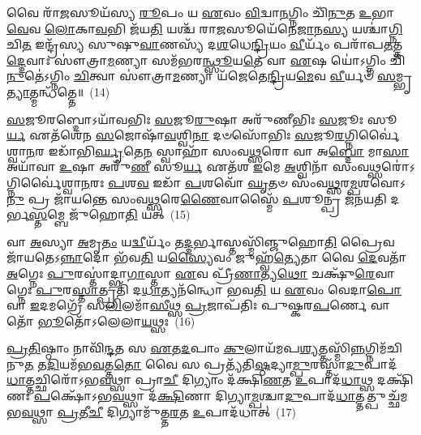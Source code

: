 𑌵𑍈 𑌰𑌾᳴\-\ul{𑌜}\-𑌸𑍂𑌯᳴𑌸𑍍𑌯 \ul{𑌰𑍂}\-𑌪𑌂 𑌯 \ul{𑌏}\-𑌵𑌂 \ul{𑌵𑌿}\-𑌦𑍍𑌵𑌾\-\ul{𑌨}\-𑌗𑍍𑌨𑌿𑌂 𑌚𑌿᳴\-\ul{𑌨𑍁}\-𑌤 \ul{𑌉}\-𑌭𑌾\-\ul{𑌵𑍇}\-𑌵 \ul{𑌲𑍋}\-𑌕𑌾\-\ul{𑌵}\-𑌭𑌿 𑌜᳴𑌯\-\ul{𑌤𑌿} 𑌯𑌶𑍍𑌚᳴ 𑌰𑌾\-\ul{𑌜}\-𑌸𑍂𑌯𑍇᳴𑌨𑍇\-\ul{𑌜𑌾}\-𑌨\-\ul{𑌸𑍍𑌯} 𑌯𑌶𑍍𑌚𑌾॑\-\ul{𑌗𑍍𑌨𑌿}\-𑌚𑌿\-\ul{𑌤} 𑌇𑌨𑍍𑌦𑍍𑌰᳴𑌸𑍍𑌯 𑌸𑍁𑌷𑍁\-\ul{𑌵𑌾}\-𑌣𑌸𑍍𑌯᳴ 𑌦\-\ul{𑌶}\-𑌧𑍇\-\ul{𑌨𑍍𑌦𑍍𑌰𑌿}\-𑌯𑌂 \ul{𑌵𑍀}\-𑌰𑍍𑌯𑌂᳴ 𑌪𑌰𑌾᳴𑌪\-\ul{𑌤}\-𑌤𑍍𑌤\-\ul{𑌦𑍍𑌦𑍇}\-𑌵𑌾𑌃 𑌸𑍗॑𑌤𑍍𑌰𑌾\-\ul{𑌮}\-𑌣𑍍𑌯𑌾 𑌸𑌮᳴𑌭𑌰\-\ul{𑌨𑍍𑌥𑍍𑌸𑍂}\-𑌯\-\ul{𑌤𑍇} 𑌵𑌾 \ul{𑌏}\-𑌷 𑌯𑍋॑\-𑌽𑌗𑍍𑌨𑌿𑌂 𑌚𑌿᳴\-\ul{𑌨𑍁}\-𑌤𑍇॑\-𑌽𑌗𑍍𑌨𑌿𑌂 \ul{𑌚𑌿}\-𑌤𑍍𑌵𑌾 𑌸𑍗॑𑌤𑍍𑌰𑌾\-\ul{𑌮}\-𑌣𑍍𑌯𑌾 𑌯᳴𑌜𑍇𑌤𑍇\-\ul{𑌨𑍍𑌦𑍍𑌰𑌿}\-𑌯\-\ul{𑌮𑍇}\-𑌵 \ul{𑌵𑍀}\-𑌰𑍍𑌯𑍞᳴ \ul{𑌸}\-𑌮𑍍𑌭𑍃\-\ul{𑌤𑍍𑌯𑌾}\-𑌤𑍍𑌮𑌨𑍍𑌧᳴𑌤𑍍𑌤𑍇॥~(14)

{\anuvakamend[{𑌤 \ul{𑌏}\-𑌵𑌾𑌨𑍍𑌵𑌵᳴𑌸𑍍𑌰𑌾𑌵𑌯\-\ul{𑌤𑍍𑌯𑍇}\-𑌤\-\ul{𑌦}\-𑌷𑍍𑌟𑌾𑌚᳴𑌤𑍍𑌵𑌾𑌰𑌿𑍞𑌶𑌚𑍍𑌚}]}%

\-\ul{𑌸}\-𑌜𑍂𑌰𑌬𑍍𑌦𑍋\-𑌽𑌯𑌾᳴𑌵𑌭𑌿𑌃 \ul{𑌸}\-𑌜𑍂\-\ul{𑌰𑍁}\-𑌷𑌾 𑌅𑌰𑍁᳴𑌣𑍀𑌭𑌿𑌃 \ul{𑌸}\-𑌜𑍂𑌃 𑌸𑍂\-\ul{𑌰𑍍𑌯} 𑌏𑌤᳴𑌶𑍇𑌨 \ul{𑌸}\-𑌜𑍋𑌷𑌾᳴\-\ul{𑌵}\-𑌶𑍍𑌵𑌿\-\ul{𑌨𑌾} 𑌦𑍞𑌸𑍋᳴𑌭𑌿𑌃 \ul{𑌸}\-𑌜𑍂\-\ul{𑌰}\-𑌗𑍍𑌨𑌿𑌰𑍍𑌵𑍈॑𑌶𑍍𑌵𑌾\-\ul{𑌨}\-𑌰 𑌇𑌡𑌾᳴𑌭𑌿\-\ul{𑌰𑍍𑌘𑍃}\-𑌤𑍇\-\ul{𑌨} 𑌸𑍍𑌵𑌾𑌹𑌾᳴ 𑌸𑌂𑌵\-\ul{𑌥𑍍𑌸}\-𑌰𑍋 𑌵𑌾 𑌅\-\ul{𑌬𑍍𑌦𑍋} 𑌮𑌾\-\ul{𑌸𑌾} 𑌅𑌯𑌾᳴𑌵𑌾 \ul{𑌉}\-𑌷𑌾 𑌅𑌰𑍁᳴\-\ul{𑌣𑍀} 𑌸𑍂\-\ul{𑌰𑍍𑌯} 𑌏𑌤᳴𑌶 \ul{𑌇}\-𑌮𑍇 \ul{𑌅}\-𑌶𑍍𑌵𑌿𑌨𑌾᳴ 𑌸𑌂𑌵\-\ul{𑌥𑍍𑌸}\-𑌰𑍋॑\-𑌽𑌗𑍍𑌨𑌿𑌰𑍍𑌵𑍈॑𑌶𑍍𑌵𑌾\-\ul{𑌨}\-𑌰𑌃 \ul{𑌪}\-𑌶\-\ul{𑌵} 𑌇𑌡𑌾᳴ \ul{𑌪}\-𑌶𑌵𑍋᳴ \ul{𑌘𑍃}\-𑌤𑍞 𑌸𑌂᳴𑌵\-\ul{𑌥𑍍𑌸}\-𑌰\-\ul{𑌮𑍍𑌪}\-𑌶𑌵𑍋\-𑌽\-\ul{𑌨𑍁} 𑌪𑍍𑌰 𑌜𑌾᳴𑌯𑌨𑍍𑌤𑍇 𑌸𑌂𑌵\-\ul{𑌥𑍍𑌸}\-𑌰𑍇\-\ul{𑌣𑍈}\-𑌵𑌾𑌸𑍍𑌮𑍈᳴ \ul{𑌪}\-𑌶𑍂𑌨𑍍𑌪𑍍𑌰 𑌜᳴𑌨𑌯𑌤𑌿 𑌦𑌰𑍍𑌭\-\ul{𑌸𑍍𑌤}\-𑌮𑍍𑌬𑍇 𑌜𑍁᳴𑌹𑍋\-\ul{𑌤𑌿} 𑌯𑌤𑍍~(15)

𑌵𑌾 \ul{𑌅}\-𑌸𑍍𑌯𑌾 \ul{𑌅}\-𑌮𑍃\-\ul{𑌤𑌂} 𑌯\-\ul{𑌦𑍍𑌵𑍀}\-𑌰𑍍𑌯𑌂᳴ 𑌤\-\ul{𑌦𑍍𑌦}\-𑌰𑍍𑌭𑌾𑌸𑍍𑌤𑌸𑍍𑌮𑌿᳴𑌞𑍍𑌜𑍁𑌹𑍋\-\ul{𑌤𑌿} 𑌪𑍍𑌰𑍈𑌵 𑌜𑌾᳴𑌯𑌤𑍇\-𑌽\-\ul{𑌨𑍍𑌨𑌾}\-𑌦𑍋 𑌭᳴𑌵\-\ul{𑌤𑌿} 𑌯\-\ul{𑌸𑍍𑌯𑍈}\-𑌵𑌂 𑌜𑍁𑌹𑍍𑌵᳴\-\ul{𑌤𑍍𑌯𑍇}\-𑌤𑌾 𑌵𑍈 \ul{𑌦𑍇}\-𑌵𑌤𑌾᳴ \ul{𑌅}\-𑌗𑍍𑌨𑍇𑌃 \ul{𑌪𑍁}\-𑌰𑌸𑍍𑌤𑌾॑𑌦𑍍𑌭𑌾\-\ul{𑌗𑌾}\-𑌸𑍍𑌤𑌾 \ul{𑌏}\-𑌵 𑌪𑍍𑌰𑍀᳴\-\ul{𑌣𑌾}\-𑌤𑍍𑌯\-\ul{𑌥𑍋} 𑌚𑌕𑍍𑌷𑍁᳴\-\ul{𑌰𑍇}\-𑌵𑌾𑌗𑍍𑌨𑍇𑌃 \ul{𑌪𑍁}\-𑌰\-\ul{𑌸𑍍𑌤𑌾}\-𑌤𑍍𑌪𑍍𑌰𑌤𑌿᳴ 𑌦\-\ul{𑌧𑌾}\-𑌤𑍍𑌯𑌨᳴𑌨𑍍𑌧𑍋 𑌭𑌵\-\ul{𑌤𑌿} 𑌯 \ul{𑌏}\-𑌵𑌂 𑌵𑍇𑌦𑌾\-\ul{𑌪𑍋} 𑌵𑌾 \ul{𑌇}\-𑌦𑌮𑌗𑍍𑌰𑍇᳴ 𑌸\-\ul{𑌲𑌿}\-𑌲𑌮𑌾᳴\-\ul{𑌸𑍀}\-𑌥𑍍𑌸 \ul{𑌪𑍍𑌰}\-𑌜𑌾𑌪᳴𑌤𑌿𑌃 𑌪𑍁𑌷𑍍𑌕𑌰\-\ul{𑌪}\-𑌰𑍍𑌣𑍇 𑌵𑌾𑌤𑍋᳴ \ul{𑌭𑍂}\-𑌤𑍋᳴\-𑌽𑌲𑍇𑌲𑌾\-\ul{𑌯}\-𑌥𑍍𑌸𑌃~(16)

\-\ul{𑌪𑍍𑌰}\-\-\ul{𑌤𑌿}\-𑌷𑍍𑌠𑌾𑌂 𑌨𑌾𑌵𑌿᳴\-\ul{𑌨𑍍𑌦}\-𑌤 𑌸 \ul{𑌏}\-𑌤\-\ul{𑌦}\-𑌪𑌾𑌂 \ul{𑌕𑍁}\-𑌲𑌾𑌯᳴𑌮𑌪\-\ul{𑌶𑍍𑌯}\-𑌤𑍍𑌤𑌸𑍍𑌮𑌿᳴\-\ul{𑌨𑍍𑌨}\-𑌗𑍍𑌨𑌿𑌮᳴𑌚𑌿𑌨𑍁\-\ul{𑌤} 𑌤\-\ul{𑌦𑌿}\-𑌯𑌮᳴𑌭\-\ul{𑌵}\-𑌤𑍍𑌤\-\ul{𑌤𑍋} 𑌵𑍈 𑌸 𑌪𑍍𑌰𑌤𑍍𑌯᳴𑌤𑌿\-\ul{𑌷𑍍𑌠}\-𑌦𑍍𑌯𑌾\-\ul{𑌮𑍍𑌪𑍁}\-𑌰𑌸𑍍𑌤𑌾᳴\-\ul{𑌦𑍁}\-𑌪𑌾\-𑌦᳴\-\ul{𑌧𑌾}\-𑌤𑍍𑌤𑌚𑍍𑌛𑌿𑌰𑍋᳴\-𑌽𑌭\-\ul{𑌵}\-𑌥𑍍𑌸𑌾 𑌪𑍍𑌰𑌾\-\ul{𑌚𑍀} 𑌦𑌿𑌗𑍍𑌯𑌾𑌂 𑌦᳴𑌕𑍍𑌷𑌿\-\ul{𑌣}\-𑌤 \ul{𑌉}\-𑌪𑌾𑌦᳴\-\ul{𑌧𑌾}\-𑌥𑍍𑌸 𑌦𑌕𑍍𑌷𑌿᳴𑌣𑌃 \ul{𑌪}\-𑌕𑍍𑌷𑍋᳴\-𑌽𑌭\-\ul{𑌵}\-𑌥𑍍𑌸𑌾 𑌦᳴\-\ul{𑌕𑍍𑌷𑌿}\-𑌣𑌾 𑌦𑌿𑌗𑍍𑌯𑌾\-\ul{𑌮𑍍𑌪}\-𑌶𑍍𑌚𑌾\-\ul{𑌦𑍁}\-𑌪𑌾\-𑌦᳴\-\ul{𑌧𑌾}\-𑌤𑍍𑌤𑌤𑍍𑌪𑍁𑌚𑍍𑌛᳴𑌮𑌭\-\ul{𑌵}\-𑌥𑍍𑌸𑌾 \ul{𑌪𑍍𑌰}\-𑌤𑍀\-\ul{𑌚𑍀} 𑌦𑌿𑌗𑍍𑌯𑌾𑌮𑍁᳴𑌤𑍍𑌤\-\ul{𑌰}\-𑌤 \ul{𑌉}\-𑌪𑌾𑌦᳴𑌧𑌾𑌤𑍍~(17)

